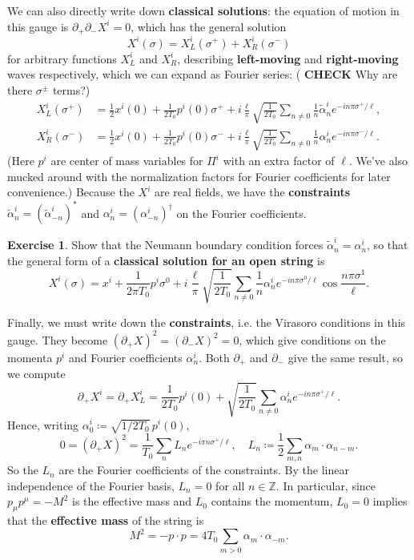 \documentclass{report}
\theoremstyle{plain}
\theoremstyle{definition}
\newtheorem{exercise}{Exercise}[section]
\theoremstyle{remark}
\newcommand{\di}{\partial}
\newcommand{\CHECK}{{\color{blue} \textbf{CHECK}}}
\newcommand{\bZ}{\mathbb{Z}}
\begin{document}
We can also directly write down {\bf classical solutions}: the
equation of motion in this gauge is $\di_+ \di_- X^i = 0$, which has
the general solution
\[ X^i(\sigma) = X^i_L(\sigma^+) + X^i_R(\sigma^-) \]
for arbitrary functions $X^i_L$ and $X^i_R$, describing {\bf
  left-moving} and {\bf right-moving} waves respectively, which we can
expand as Fourier series: (\CHECK{} Why are there $\sigma^\pm$ terms?)
\begin{align*}
  X^i_L(\sigma^+) &= \frac{1}{2}x^i(0) + \frac{1}{2T_0} p^i(0) \sigma^+ + i\frac{\ell}{\pi}\sqrt{\frac{1}{2T_0}} \sum_{n \neq 0} \frac{1}{n} \tilde{\alpha}_n^i e^{-in\pi\sigma^+/\ell}, \\
  X^i_R(\sigma^-) &= \frac{1}{2}x^i(0) + \frac{1}{2T_0} p^i(0) \sigma^- + i\frac{\ell}{\pi}\sqrt{\frac{1}{2T_0}} \sum_{n \neq 0} \frac{1}{n} \alpha_n^i e^{-in\pi\sigma^-/\ell}.
\end{align*}
(Here $p^i$ are center of mass variables for $\Pi^i$ with an extra
factor of $\ell$. We've also mucked around with the normalization
factors for Fourier coefficients for later convenience.) Because the
$X^i$ are real fields, we have the {\bf constraints}
$\tilde{\alpha}^i_n = (\tilde{\alpha}^i_{-n})^*$ and $\alpha^i_n =
(\alpha^i_{-n})^\dag$ on the Fourier coefficients.

\begin{exercise}
  Show that the Neumann boundary condition forces $\tilde{\alpha}_n^i
  = \alpha_n^i$, so that the general form of a {\bf classical solution
    for an open string} is
  \[ X^i(\sigma) = x^i + \frac{1}{2\pi T_0}p^i\sigma^0 + i\frac{\ell}{\pi}\sqrt{\frac{1}{2T_0}} \sum_{n \neq 0} \frac{1}{n} \alpha_n^i e^{-in\pi\sigma^0/\ell} \cos \frac{n\pi\sigma^1}{\ell}. \]
\end{exercise}

Finally, we must write down the {\bf constraints}, i.e. the Virasoro
conditions in this gauge. They become $(\di_+X)^2 = (\di_-X)^2 = 0$,
which give conditions on the momenta $p^i$ and Fourier coefficients
$\alpha_n^i$. Both $\di_+$ and $\di_-$ give the same result, so we
compute
\[ \di_+X^i = \di_+X^i_L = \frac{1}{2T_0} p^i(0) + \sqrt{\frac{1}{2T_0}} \sum_{n \neq 0} \alpha_n^i e^{-in\pi\sigma^+/\ell}. \]
Hence, writing $\alpha_0^i \coloneqq \sqrt{1/2T_0} \, p^i(0)$,
\[ 0 = (\di_+X)^2 = \frac{1}{T_0} \sum_n L_n e^{-i\pi n \sigma^+/\ell}, \quad L_n \coloneqq \frac{1}{2} \sum_{m,n} \alpha_m \cdot \alpha_{n-m}. \]
So the $L_n$ are the Fourier coefficients of the constraints. By the
linear independence of the Fourier basis, $L_n = 0$ for all $n \in
\bZ$. In particular, since $p_\mu p^\mu = -M^2$ is the effective mass
and $L_0$ contains the momentum, $L_0 = 0$ implies that the {\bf
  effective mass} of the string is
\[ M^2 = -p \cdot p = 4 T_0 \sum_{m > 0} \alpha_m \cdot \alpha_{-m}. \]
\end{document}
